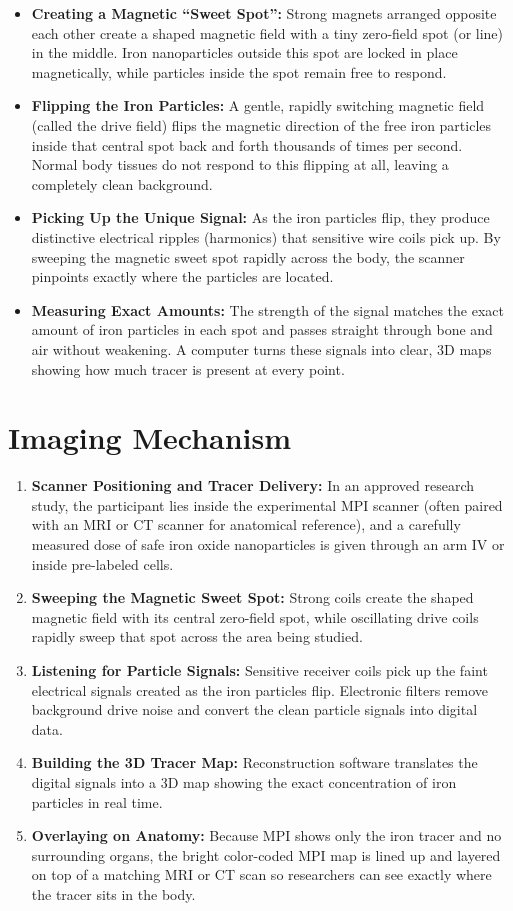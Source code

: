 \begin{itemize}
    \item \textbf{Creating a Magnetic ``Sweet Spot'':} Strong magnets arranged opposite each other create a shaped magnetic field with a tiny zero-field spot (or line) in the middle. Iron nanoparticles outside this spot are locked in place magnetically, while particles inside the spot remain free to respond.
    \item \textbf{Flipping the Iron Particles:} A gentle, rapidly switching magnetic field (called the drive field) flips the magnetic direction of the free iron particles inside that central spot back and forth thousands of times per second. Normal body tissues do not respond to this flipping at all, leaving a completely clean background.
    \item \textbf{Picking Up the Unique Signal:} As the iron particles flip, they produce distinctive electrical ripples (harmonics) that sensitive wire coils pick up. By sweeping the magnetic sweet spot rapidly across the body, the scanner pinpoints exactly where the particles are located.
    \item \textbf{Measuring Exact Amounts:} The strength of the signal matches the exact amount of iron particles in each spot and passes straight through bone and air without weakening. A computer turns these signals into clear, 3D maps showing how much tracer is present at every point.
\end{itemize}

\section{Imaging Mechanism}

\begin{enumerate}
    \item \textbf{Scanner Positioning and Tracer Delivery:} In an approved research study, the participant lies inside the experimental MPI scanner (often paired with an MRI or CT scanner for anatomical reference), and a carefully measured dose of safe iron oxide nanoparticles is given through an arm IV or inside pre-labeled cells.
    \item \textbf{Sweeping the Magnetic Sweet Spot:} Strong coils create the shaped magnetic field with its central zero-field spot, while oscillating drive coils rapidly sweep that spot across the area being studied.
    \item \textbf{Listening for Particle Signals:} Sensitive receiver coils pick up the faint electrical signals created as the iron particles flip. Electronic filters remove background drive noise and convert the clean particle signals into digital data.
    \item \textbf{Building the 3D Tracer Map:} Reconstruction software translates the digital signals into a 3D map showing the exact concentration of iron particles in real time.
    \item \textbf{Overlaying on Anatomy:} Because MPI shows only the iron tracer and no surrounding organs, the bright color-coded MPI map is lined up and layered on top of a matching MRI or CT scan so researchers can see exactly where the tracer sits in the body.
\end{enumerate}

